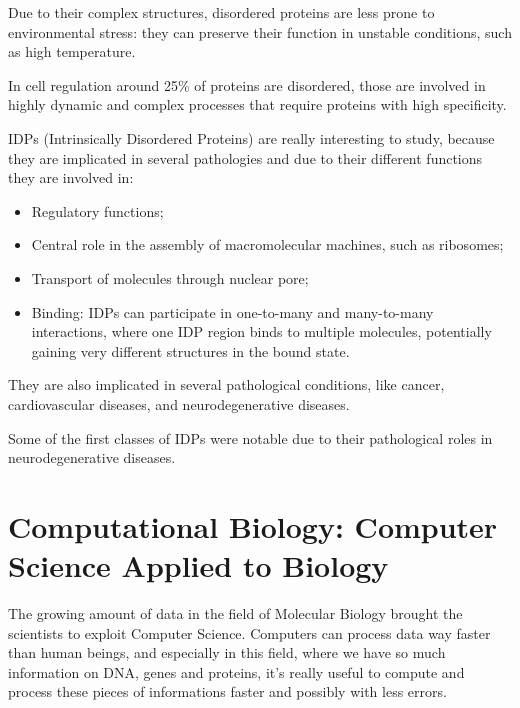 Due to their complex structures, disordered proteins are less prone to environmental stress: they can preserve their function in unstable conditions, such as high temperature.

In cell regulation around 25\% of proteins are disordered, those are involved in highly dynamic and complex processes that require proteins with high specificity.

IDPs (Intrinsically Disordered Proteins) are really interesting to study, because they are implicated in several pathologies and due to their different functions they are involved in:
\begin{itemize}
	\item Regulatory functions;
	\item Central role in the assembly of macromolecular machines, such as ribosomes;
	\item Transport of molecules through nuclear pore;
	\item Binding: IDPs can participate in one-to-many and many-to-many interactions, where one IDP region binds to multiple molecules, potentially gaining very different structures in the bound state.
\end{itemize}
 They are also implicated in several pathological conditions, like cancer, cardiovascular diseases, and neurodegenerative diseases. 

Some of the first classes of IDPs were notable due to their pathological roles in neurodegenerative diseases.

\vspace{20em}

\pagebreak

\section{Computational Biology: Computer Science Applied to Biology}
The growing amount of data in the field of Molecular Biology brought the scientists to exploit Computer Science. Computers can process data way faster than human beings, and especially in this field, where we have so much information on DNA, genes and proteins, it's really useful to compute and process these pieces of informations faster and possibly with less errors.


